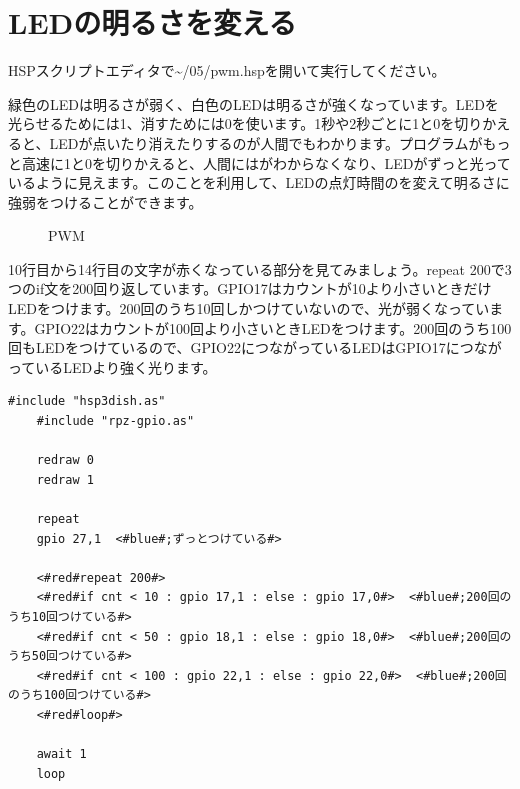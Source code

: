 \documentclass[text05.tex]{subfiles}
\begin{document}
\section{LEDの明るさを変える}
HSPスクリプトエディタで\textasciitilde /05/pwm.hspを開いて実行してください。

緑色のLEDは明るさが弱く、白色のLEDは明るさが強くなっています。LEDを光らせるためには1、消すためには0を使います。1秒や2秒ごとに1と0を切りかえると、LEDが点いたり消えたりするのが人間でもわかります。プログラムがもっと高速に1と0を切りかえると、人間にはがわからなくなり、LEDがずっと光っているように見えます。このことを利用して、LEDの点灯時間のを変えて明るさに強弱をつけることができます。

\begin{figure}[H]
\centering

\caption{PWM}
\end{figure}

10行目から14行目の文字が赤くなっている部分を見てみましょう。repeat 200で3つのif文を200回り返しています。GPIO17はカウントが10より小さいときだけLEDをつけます。200回のうち10回しかつけていないので、光が弱くなっています。GPIO22はカウントが100回より小さいときLEDをつけます。200回のうち100回もLEDをつけているので、GPIO22につながっているLEDはGPIO17につながっているLEDより強く光ります。

\begin{lstlisting}[caption=pwm.hsp,label=pwm.hsp]
    #include "hsp3dish.as"
    #include "rpz-gpio.as"
    
    redraw 0
    redraw 1
    
    repeat
    gpio 27,1  <#blue#;ずっとつけている#>
    
    <#red#repeat 200#>
    <#red#if cnt < 10 : gpio 17,1 : else : gpio 17,0#>  <#blue#;200回のうち10回つけている#>
    <#red#if cnt < 50 : gpio 18,1 : else : gpio 18,0#>  <#blue#;200回のうち50回つけている#>
    <#red#if cnt < 100 : gpio 22,1 : else : gpio 22,0#>  <#blue#;200回のうち100回つけている#>
    <#red#loop#>
    
    await 1
    loop
    \end{lstlisting}
\end{document}

